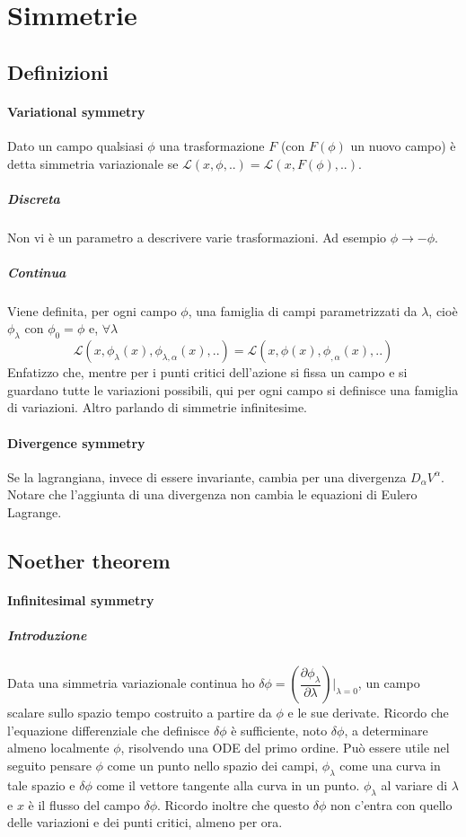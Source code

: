 \documentclass[]{article}
\newcommand{\al}{\alpha}
\begin{document}
\section*{Simmetrie}
\subsection*{Definizioni}
\paragraph{Variational symmetry} Dato un campo qualsiasi $\phi$ una trasformazione $F$ (con $F(\phi)$ un nuovo campo) è detta simmetria variazionale se $\mathcal{L} (x, \phi, ..) = \mathcal{L} (x, F(\phi), ..)$.
\subparagraph{Discreta} Non vi è un parametro a descrivere varie trasformazioni. Ad esempio $\phi \rightarrow -\phi$.
\subparagraph{Continua} Viene definita, per ogni campo $\phi$, una famiglia di campi parametrizzati da $\lambda$, cioè $\phi_\lambda$ con $\phi_0 = \phi$ e, $\forall \lambda$
$$\mathcal{L}(x, \phi_\lambda(x), \phi_{\lambda,\al}(x), ..) = \mathcal{L} (x, \phi(x), \phi_{,\al}(x), ..)$$
Enfatizzo che, mentre per i punti critici dell'azione si fissa un campo e si guardano tutte le variazioni possibili, qui per ogni campo si definisce una famiglia di variazioni.
Altro parlando di simmetrie infinitesime.
\paragraph{Divergence symmetry} Se la lagrangiana, invece di essere invariante, cambia per una divergenza $D_\al V^\al$. Notare che l'aggiunta di una divergenza non cambia le equazioni di Eulero Lagrange.

\subsection*{Noether theorem}
\paragraph{Infinitesimal symmetry}
\subparagraph{Introduzione} Data una simmetria variazionale continua ho $\delta \phi = \left(\dfrac{\partial \phi_\lambda}{\partial \lambda}\right)|_{\lambda=0}$, un campo scalare sullo spazio tempo costruito a partire da $\phi$ e le sue derivate. Ricordo che l'equazione differenziale che definisce $\delta\phi$ è sufficiente, noto $\delta \phi$, a determinare almeno localmente $\phi$, risolvendo una ODE del primo ordine. Può essere utile nel seguito pensare $\phi$ come un punto nello spazio dei campi, $\phi_\lambda$ come una curva in tale spazio e $\delta \phi$ come il vettore tangente alla curva in un punto. $\phi_\lambda$ al variare di $\lambda$ e $x$ è il flusso del campo $\delta \phi$. Ricordo inoltre che questo $\delta \phi$ non c'entra con quello delle variazioni e dei punti critici, almeno per ora.\\
\end{document}
